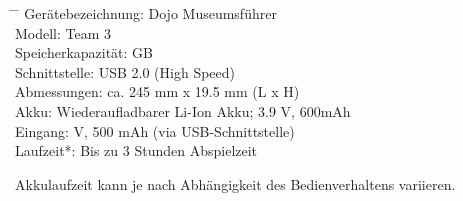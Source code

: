 \begin{tabbing}
\hspace{40mm}		\= \hspace{15mm} \=\kill
Gerätebezeichnung:	\> Dojo Museumsführer \\[4mm]
Modell:				\> Team 3 \\[4mm]
Speicherkapazität:	 GB \\[4mm]
Schnittstelle:		\> USB 2.0 (High Speed) \\[4mm]
Abmessungen:		\> ca. 245 mm x 19.5 mm (L x H) \\[4mm]
Akku:				\> Wiederaufladbarer Li-Ion Akku; 3.9 V, 600mAh \\[4mm]
Eingang:			 V, 500 mAh (via USB-Schnittstelle) \\[4mm]
Laufzeit*:			\> Bis zu 3 Stunden Abspielzeit \\[4mm]
\end{tabbing}

\begin{description}
\item *Akkulaufzeit kann je nach Abhängigkeit des Bedienverhaltens variieren.
\end{description}